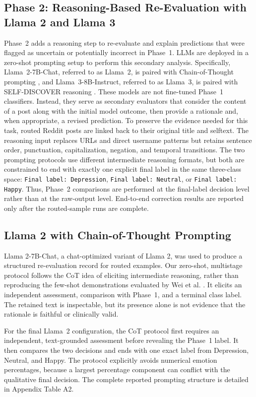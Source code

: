 \documentclass{ieeeaccess}
\begin{document}
\subsection{Phase 2: Reasoning-Based Re-Evaluation with Llama 2 and Llama 3}

Phase~2 adds a reasoning step to re-evaluate and explain predictions that were flagged as uncertain or potentially incorrect in Phase~1. LLMs are deployed in a zero-shot prompting setup to perform this secondary analysis. Specifically, Llama~2-7B-Chat, referred to as Llama~2, is paired with Chain-of-Thought prompting \cite{ref17}, and Llama~3-8B-Instruct, referred to as Llama~3, is paired with SELF-DISCOVER reasoning \cite{ref18}. These models are not fine-tuned Phase~1 classifiers. Instead, they serve as secondary evaluators that consider the content of a post along with the initial model outcome, then provide a rationale and, when appropriate, a revised prediction. To preserve the evidence needed for this task, routed Reddit posts are linked back to their original title and selftext. The reasoning input replaces URLs and direct username patterns but retains sentence order, punctuation, capitalization, negation, and temporal transitions. The two prompting protocols use different intermediate reasoning formats, but both are constrained to end with exactly one explicit final label in the same three-class space: \texttt{Final label: Depression}, \texttt{Final label: Neutral}, or \texttt{Final label: Happy}. Thus, Phase~2 comparisons are performed at the final-label decision level rather than at the raw-output level. End-to-end correction results are reported only after the routed-sample runs are complete.

\subsection{Llama 2 with Chain-of-Thought Prompting}

Llama 2-7B-Chat, a chat-optimized variant of Llama 2, was used to produce a structured re-evaluation record for routed examples. Our zero-shot, multistage protocol follows the CoT idea of eliciting intermediate reasoning, rather than reproducing the few-shot demonstrations evaluated by Wei et al. \cite{ref17}. It elicits an independent assessment, comparison with Phase~1, and a terminal class label. The retained text is inspectable, but its presence alone is not evidence that the rationale is faithful or clinically valid.

For the final Llama~2 configuration, the CoT protocol first requires an independent, text-grounded assessment before revealing the Phase~1 label. It then compares the two decisions and ends with one exact label from Depression, Neutral, and Happy. The protocol explicitly avoids numerical emotion percentages, because a largest percentage component can conflict with the qualitative final decision. The complete reported prompting structure is detailed in Appendix Table A2.
\end{document}
